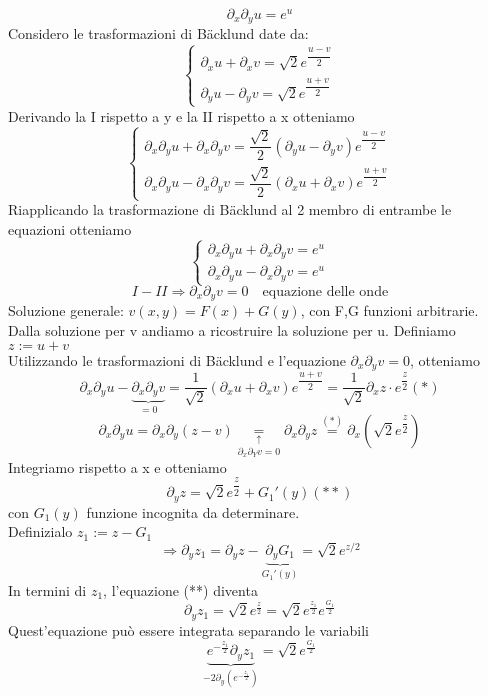 \documentclass[a4paper,11pt]{report}
\newcommand{\Backlund}{B{\"a}cklund }
\begin{document}
$$
\partial_x\partial_y u = e^u
$$
Considero le trasformazioni di \Backlund  date da:
$$
\left\{\begin{matrix}
\partial_x u + \partial_x v = \sqrt{2}e^{\dfrac{u-v}{2}} \\
\partial_y u - \partial_y v = \sqrt{2}e^{\dfrac{u+v}{2}}
\end{matrix}\right.
$$
Derivando la I rispetto a y e la II rispetto a x otteniamo
$$
\left\{\begin{matrix}
\partial_x\partial_y u + \partial_x \partial_y v = \dfrac{\sqrt{2}}{2}\left(\partial_y u - \partial_y v \right)e^{\dfrac{u-v}{2}} \\
\partial_x\partial_y u - \partial_x \partial_y v = \dfrac{\sqrt{2}}{2}\left(\partial_x u + \partial_x v \right)e^{\dfrac{u+v}{2}}
\end{matrix}\right.
$$
Riapplicando la trasformazione di \Backlund al 2 membro di entrambe le equazioni otteniamo
$$
\left\{\begin{matrix}
\partial_x\partial_y u + \partial_x \partial_y v = e^u \\
\partial_x\partial_y u - \partial_x \partial_y v = e^u
\end{matrix}\right.
$$
$$
I - II \Rightarrow\partial_x\partial_y v=0\quad \text{equazione delle onde}
$$
Soluzione generale: $v(x,y)=F(x)+G(y)$, con F,G funzioni arbitrarie.\\
Dalla soluzione per v andiamo a ricostruire la soluzione per u. Definiamo $z:=u+v$\\
Utilizzando le trasformazioni di \Backlund e l'equazione $\partial_x \partial_y v=0$, otteniamo
$$
\partial_x\partial_y u -\underset{=0}{\underbrace{\partial_x \partial_y v}} = \dfrac{1}{\sqrt{2}}\left(\partial_x u + \partial_x v\right)e^{\dfrac{u+v}{2}}=\dfrac{1}{\sqrt{2}}\partial_x z \cdot e^{\dfrac{z}{2}} (*)
$$
$$
\partial_x\partial_y u = \partial_x \partial_y (z-v)\underset{\partial_x \partial_Y v=0}{\underset{\uparrow}{=}}\partial_x \partial_y z \overset{(*)}{=}\partial_x \left(\sqrt{2}e^{\dfrac{z}{2}}\right)
$$
Integriamo rispetto a x e otteniamo
$$
\partial_y z = \sqrt{2}e^{\dfrac{z}{2}}+ G_1'(y) (**)
$$
con $G_1(y)$ funzione incognita da determinare.\\
Definizialo $z_1:=z-G_1$
$$
\Rightarrow \partial_y z_1 = \partial_y z- \underset{G_1'(y)}{\underbrace{\partial_y G_1}}=\sqrt{2}e^{z/2}
$$
In termini di $z_1$, l'equazione (**) diventa
$$
\partial_y z_1=\sqrt{2}e^{\frac{z}{2}}=\sqrt{2}e^{\frac{z_1}{2}}e^{\frac{G_1}{2}}
$$
Quest'equazione può essere integrata separando le variabili
$$
\underset{-2\partial_y\left(e^{-\frac{z_1}{2}} \right)}{\underbrace{e^{-\frac{z_1}{2}}\partial_y z_1}}=\sqrt{2}e^{\frac{G_1}{2}}
$$
\end{document}
